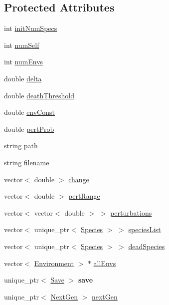 \subsection*{Protected Attributes}
\begin{DoxyCompactItemize}
\item 
int \hyperlink{classEnvironment_a5c1c5043ec7885eb05d88590f405c02b}{init\+Num\+Specs}
\item 
int \hyperlink{classEnvironment_a2563f570023ff1e17f87549bcf2fab59}{num\+Self}
\item 
int \hyperlink{classEnvironment_ab9b14bfdd2e25805a6e67463e948da4a}{num\+Envs}
\item 
double \hyperlink{classEnvironment_ab21bc1c8553a1649b306dc80f7db558b}{delta}
\item 
double \hyperlink{classEnvironment_a79a718ed66d6e70b38763150b4245064}{death\+Threshold}
\item 
double \hyperlink{classEnvironment_a664313c95d2a9afc397ab4bf6f4f1457}{env\+Const}
\item 
double \hyperlink{classEnvironment_ae56ec7b378c091a2173281b01d87249b}{pert\+Prob}
\item 
string \hyperlink{classEnvironment_a27a1684288d74f2cabb8cfbd0848b14e}{path}
\item 
string \hyperlink{classEnvironment_afefeccf87332c116006372e3ee197452}{filename}
\item 
vector$<$ double $>$ \hyperlink{classEnvironment_a4dac7620968f061a62c2b51f4a29e402}{change}
\item 
vector$<$ double $>$ \hyperlink{classEnvironment_af1c4ab4f5795e5c789bcd76f80736c5c}{pert\+Range}
\item 
vector$<$ vector$<$ double $>$ $>$ \hyperlink{classEnvironment_a9339f48bc16de4c77313f70d4f201458}{perturbations}
\item 
vector$<$ unique\+\_\+ptr$<$ \hyperlink{classSpecies}{Species} $>$ $>$ \hyperlink{classEnvironment_ac27d43c32a9db69a4115d09b3145831a}{species\+List}
\item 
vector$<$ unique\+\_\+ptr$<$ \hyperlink{classSpecies}{Species} $>$ $>$ \hyperlink{classEnvironment_a5ff095d15af0aaf954a0ad9afe5d8a01}{dead\+Species}
\item 
vector$<$ \hyperlink{classEnvironment}{Environment} $>$ $\ast$ \hyperlink{classEnvironment_a429ca4342b5a89b28be803c166a48c71}{all\+Envs}
\item 
\mbox{\label{classEnvironment_a65ccaef280fcfcfc20eef204c5d190ef}} 
unique\+\_\+ptr$<$ \hyperlink{classSave}{Save} $>$ {\bfseries save}
\item 
unique\+\_\+ptr$<$ \hyperlink{classNextGen}{Next\+Gen} $>$ \hyperlink{classEnvironment_ad696c5a7be91ffc89586abb10281e181}{next\+Gen}
\end{DoxyCompactItemize}


